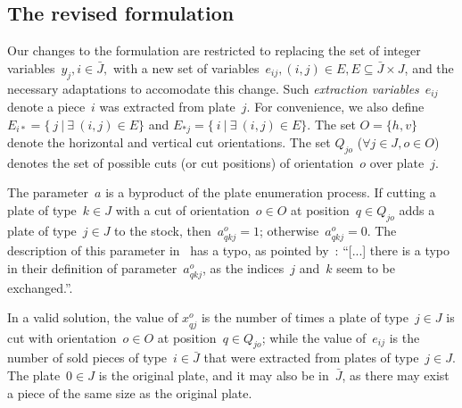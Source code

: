 
\subsection{The revised formulation}

Our changes to the formulation are restricted to replacing the set of integer variables~\(y_j, i \in \bar{J},\) with a new set of variables~\(e_{ij}, (i, j) \in E, E \subseteq \bar{J} \times J\), and the necessary adaptations to accomodate this change.
Such \emph{extraction variables}~\(e_{ij}\) denote a piece~\(i\) was extracted from plate~\(j\).
For convenience, we also define \(E_{i*} = \{~j~|~\exists~(i, j) \in E \}\) and \(E_{*j} = \{~i~|~\exists~(i, j) \in E \}\).  
The set \(O = \{h, v\}\) denote the horizontal and vertical cut orientations.
The set \(Q_{jo}\) (\(\forall j \in J, o \in O\)) denotes the set of possible cuts (or cut positions) of orientation~\(o\) over plate~\(j\).

The parameter~\(a\) is a byproduct of the plate enumeration process.
If cutting a plate of type~\(k \in J\) with a cut of orientation~\(o \in O\) at position~\(q \in Q_{jo}\) adds a plate of type~\(j \in J\) to the stock, then~\(a^o_{qkj} = 1\); otherwise~\(a^o_{qkj} = 0\).
The description of this parameter in~\cite{furini:2016} has a typo, as pointed by~\cite{martin:2020}:
``[...] there is a typo in their definition of parameter~\(a^o_{qkj}\), as the indices~\(j\) and~\(k\) seem to be exchanged.''.

In a valid solution, the value of \(x^o_{qj}\) is the number of times a plate of type~\(j \in J\) is cut with orientation~\(o \in O\) at position~\(q \in Q_{jo}\); while the value of~\(e_{ij}\) is the number of sold pieces of type~\(i \in \bar{J}\) that were extracted from plates of type~\(j \in J\).
The plate~\(0 \in J\) is the original plate, and it may also be in~\(\bar{J}\), as there may exist a piece of the same size as the original plate.

